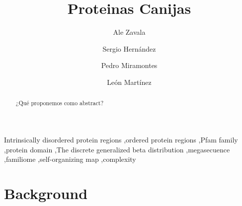 \documentclass[preprint,12pt]{elsarticle}
\begin{document}
\begin{frontmatter}


\title{Proteinas Canijas}




\author[1]{Ale Zavala}
\author[1]{Sergio Hern\'andez }
\author[1]{Pedro Miramontes}
\author[2]{León Martínez}

\address[1]{Facultad de Ciencias, National Autonomous University of Mexico, Mexico City 04510, Mexico}
\address[2]{Metropolitan Autonomous University}

\begin{abstract}
¿Qué proponemos como abstract?
\end{abstract}

\begin{keyword}
Intrinsically disordered protein regions \sep ordered protein regions \sep Pfam family \sep protein domain \sep The discrete generalized beta distribution \sep megasecuence \sep familiome \sep self-organizing map \sep complexity


\end{keyword}

\end{frontmatter}

\linenumbers

\section{Background}
\label{S:1}
\end{document}
